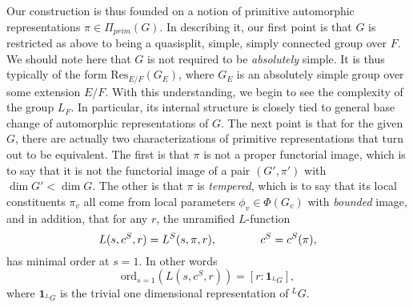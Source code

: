 \documentclass[preprint,12pt, leqno]{elsarticle}
\newcommand{\ubf}[1]{\textit{#1}}
\newcommand{\LG}{\;^LG}
\newcommand{\Res}{\mbox{Res}}
\newcommand{\SP}{\mkern70mu }
\numberwithin{equation}{section}
\theoremstyle{named}
\begin{document}
Our construction is thus founded on a notion of primitive automorphic representations $\pi\in\Pi_{prim}(G)$. In describing it, our first point is that $G$ is restricted as above to being a quasisplit, simple, simply connected group over $F$. We should note here that $G$ is not required to be \ubf{absolutely} simple. It is thus typically of the form $\Res_{E/F}(G_E)$, where $G_E$ is an absolutely simple group over some extension $E/F$. With this understanding, we begin to see the complexity of the group $L_F$. In particular, its internal structure is closely tied to general base change of automorphic representations of $G$. The next point is that for the given $G$, there are actually two characterizations of primitive representations that turn out to be equivalent. The first is that $\pi$ is not a proper functorial image, which is to say that it is not the functorial image of a pair $(G', \pi')$ with $\dim G' < \dim G$. The other is that $\pi$ is \ubf{tempered}, which is to say that its local constituents $\pi_v$ all come from local parameters $\phi_v\in\Phi(G_v)$ with \ubf{bounded} image, and in addition, that for any $r$, the unramified $L$-function
\begin{equation*}
    L(s, c^S, r) = L^S(s, \pi, r), \SP c^S = c^S(\pi),
\end{equation*}
has minimal order at $s = 1$. In other words
\begin{equation*}
    \mbox{ord}_{s = 1}(L(s, c^S, r)) = [r : \mathbf{1}_{^LG}],
\end{equation*}
where $\mathbf{1}_{^LG}$ is the trivial one dimensional representation of$\LG$.
\end{document}
